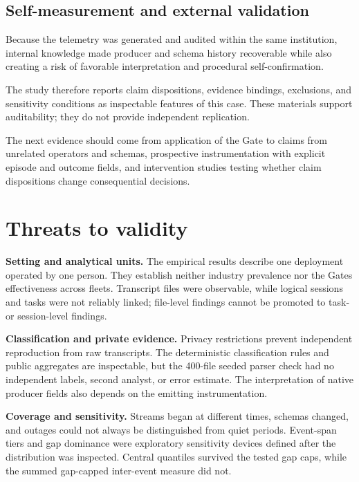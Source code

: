 \documentclass[12pt]{article}
\begin{document}
\subsection{Self-measurement and external validation}\label{self-measurement-and-external-validation}

Because the telemetry was generated and audited within the same institution, internal knowledge made producer and schema history recoverable while also creating a risk of favorable interpretation and procedural self-confirmation.

The study therefore reports claim dispositions, evidence bindings, exclusions, and sensitivity conditions as inspectable features of this case. These materials support auditability; they do not provide independent replication.

The next evidence should come from application of the Gate to claims from unrelated operators and schemas, prospective instrumentation with explicit episode and outcome fields, and intervention studies testing whether claim dispositions change consequential decisions.

\section{Threats to validity}\label{threats-to-validity}

\textbf{Setting and analytical units.} The empirical results describe one deployment operated by one person. They establish neither industry prevalence nor the Gate\textquotesingle s effectiveness across fleets. Transcript files were observable, while logical sessions and tasks were not reliably linked; file-level findings cannot be promoted to task- or session-level findings.

\textbf{Classification and private evidence.} Privacy restrictions prevent independent reproduction from raw transcripts. The deterministic classification rules and public aggregates are inspectable, but the 400-file seeded parser check had no independent labels, second analyst, or error estimate. The interpretation of native producer fields also depends on the emitting instrumentation.

\textbf{Coverage and sensitivity.} Streams began at different times, schemas changed, and outages could not always be distinguished from quiet periods. Event-span tiers and gap dominance were exploratory sensitivity devices defined after the distribution was inspected. Central quantiles survived the tested gap caps, while the summed gap-capped inter-event measure did not.
\end{document}
